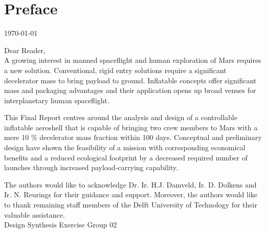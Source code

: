 \section*{Preface}\label{cha:preface}

\begin{flushright}
	\today
\end{flushright}

Dear Reader,	
\\ [1cm]
A growing interest in manned spaceflight and human exploration of Mars requires a new solution. Conventional, rigid entry solutions require a significant decelerator mass to bring payload to ground. Inflatable concepts offer significant mass and packaging advantages and their application opens up broad venues for interplanetary human spaceflight. 

This Final Report centres around the analysis and design of a controllable inflatable aeroshell that is capable of bringing two crew members to Mars with a mere 10 \% decelerator mass fraction within 100 days. Conceptual and preliminary design have shown the feasibility of a mission with corresponding economical benefits and a reduced ecological footprint by a decreased required number of launches through increased payload-carrying capability.

The authors would like to acknowledge Dr. Ir. H.J. Damveld, Ir. D. Dolkens and Ir. N. Reurings for their guidance and support. Moreover, the authors would like to thank remaining staff members of the Delft University of Technology for their valuable assistance.
\\ [1.5cm]
Design Synthesis Exercise Group 02
